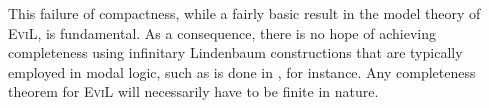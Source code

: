 This failure of compactness, while a fairly basic result in the model
theory of \textsc{EviL}, is fundamental.  As a consequence, there is
no hope of achieving completeness using infinitary Lindenbaum
constructions that are typically employed in modal logic, such as is
done in \citep[][chapter 4]{blackburn_modal_2001}, for instance.
Any completeness theorem for \textsc{EviL} will necessarily have to be
finite in nature.